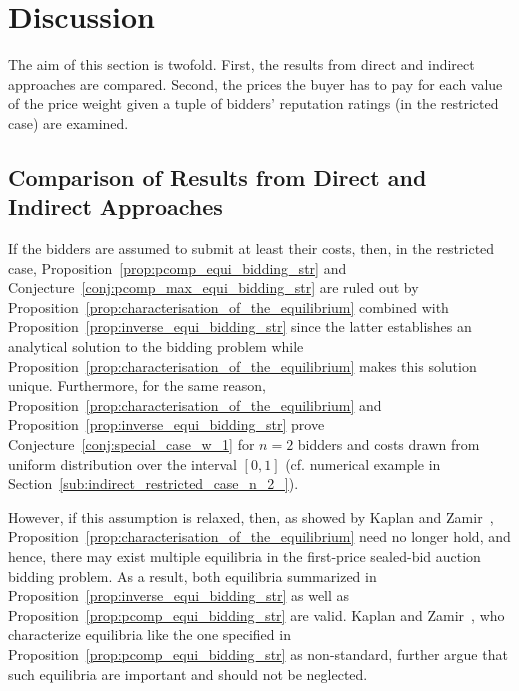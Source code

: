 \section{Discussion} %
\label{sec:discussion}
The aim of this section is twofold. First, the results from direct and indirect approaches are compared. Second, the prices the buyer has to pay for each value of the price weight given a tuple of bidders' reputation ratings (in the restricted case) are examined.

\subsection{Comparison of Results from Direct and Indirect Approaches} %
\label{sub:comparison_of_results_from_direct_and_indirect_approaches}
If the bidders are assumed to submit at least their costs, then, in the restricted case, Proposition~\ref{prop:pcomp_equi_bidding_str} and Conjecture~\ref{conj:pcomp_max_equi_bidding_str} are ruled out by Proposition~\ref{prop:characterisation_of_the_equilibrium} combined with Proposition~\ref{prop:inverse_equi_bidding_str} since the latter establishes an analytical solution to the bidding problem while Proposition~\ref{prop:characterisation_of_the_equilibrium} makes this solution unique. Furthermore, for the same reason, Proposition~\ref{prop:characterisation_of_the_equilibrium} and Proposition~\ref{prop:inverse_equi_bidding_str} prove Conjecture~\ref{conj:special_case_w_1} for $n=2$ bidders and costs drawn from uniform distribution over the interval $[0,1]$ (cf. numerical example in Section~\ref{sub:indirect_restricted_case_n_2_}).

However, if this assumption is relaxed, then, as showed by Kaplan and Zamir~\cite{KaplanZamir2011}, Proposition~\ref{prop:characterisation_of_the_equilibrium} need no longer hold, and hence, there may exist multiple equilibria in the first-price sealed-bid auction bidding problem. As a result, both equilibria summarized in Proposition~\ref{prop:inverse_equi_bidding_str} as well as Proposition~\ref{prop:pcomp_equi_bidding_str} are valid. Kaplan and Zamir~\cite{KaplanZamir2011}, who characterize equilibria like the one specified in Proposition~\ref{prop:pcomp_equi_bidding_str} as non-standard, further argue that such equilibria are important and should not be neglected.

